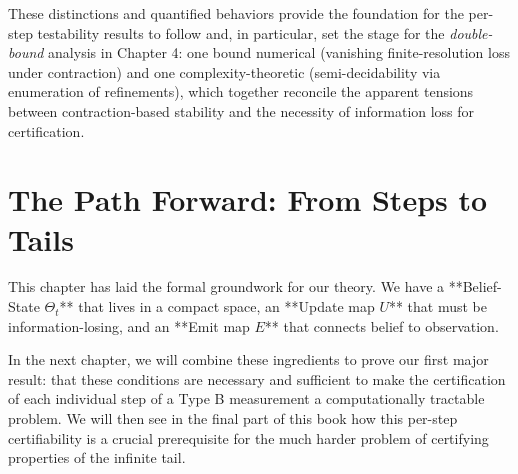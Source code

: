 \documentclass[12pt]{article}
\theoremstyle{definition}
\theoremstyle{plain}
\begin{document}
These distinctions and quantified behaviors provide the foundation for the per-step testability results to follow and, in particular, set the stage for the \emph{double-bound} analysis in Chapter 4: one bound numerical (vanishing finite-resolution loss under contraction) and one complexity-theoretic (semi-decidability via enumeration of refinements), which together reconcile the apparent tensions between contraction-based stability and the necessity of information loss for certification.


\section{The Path Forward: From Steps to Tails}

This chapter has laid the formal groundwork for our theory. We have a **Belief-State $\Theta_t$** that lives in a compact space, an **Update map $U$** that must be information-losing, and an **Emit map $E$** that connects belief to observation.

In the next chapter, we will combine these ingredients to prove our first major result: that these conditions are necessary and sufficient to make the certification of each individual step of a Type B measurement a computationally tractable problem. We will then see in the final part of this book how this per-step certifiability is a crucial prerequisite for the much harder problem of certifying properties of the infinite tail.
\end{document}
